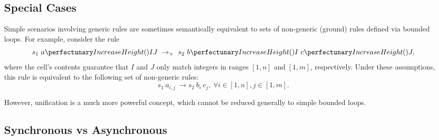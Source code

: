 \subsection{Special Cases}
Simple scenarios involving generic rules are sometimes 
semantically equivalent to sets of non-generic (ground) rules defined via bounded loops.
For example, consider the rule
\[
s_1 ~ \cpfunc{a}{IJ} ~ \rightarrow_\cpmaxpar ~ s_2 ~ \cpfunc{b}{I} ~ \cpfunc{c}{J},
\]
where the cell's contents guarantee that \(I\) and \(J\) 
only match integers in ranges \([1,n]\) and \([1,m]\), respectively.
Under these assumptions, 
this rule is equivalent to the following set of non-generic rules:
\[
s_1 ~ a_{i,j} ~ \rightarrow s_2 ~ b_i ~ c_j, ~ \forall i \in [1,n], j \in [1,m].
\]

However, unification is a much more powerful concept, 
which cannot be reduced generally to simple bounded loops.

\subsection{\label{sec:cps:syncasync}Synchronous vs Asynchronous}

